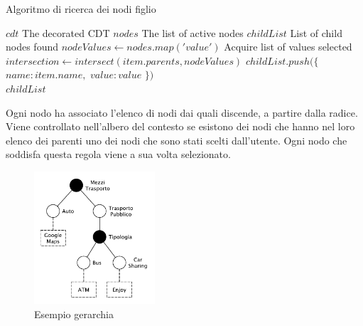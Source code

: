 \begin{algorithm}
	\caption{Algoritmo di ricerca dei nodi figlio}
	\label{alg:algoritmo-ricerca-nodi-figlio}
	\begin{algorithmic}
		\Require
			\Statex $cdt$ \Comment The decorated CDT
			\Statex $nodes$ \Comment The list of active nodes
		\Ensure
			\Statex $childList$ \Comment List of child nodes found
			\Statex
		\State $nodeValues \gets nodes.map('value')$ \Comment Acquire list of values selected
			\State $ intersection \gets intersect(item.parents, nodeValues) $
					\State $ childList.push(\{ $
					\State\hspace{\algorithmicindent} $ name: item.name, $
					\State\hspace{\algorithmicindent} $ value: value $
					\State $ \}) $
				\EndFor
			\EndIf
		\EndFor\\
		\Return $ childList $
	\end{algorithmic}
\end{algorithm}

Ogni nodo ha associato l'elenco di nodi dai quali discende, a partire dalla radice. Viene controllato nell'albero del contesto se esistono dei nodi che hanno nel loro elenco dei parenti uno dei nodi che sono stati scelti dall'utente. Ogni nodo che soddisfa questa regola viene a sua volta selezionato.

\begin{figure}[ht]
	\centering
	\includegraphics[width=0.4\textwidth]{4-metodologia/Immagini/esempio-gerarchia.pdf}
	\caption{Esempio gerarchia}\label{fig:esempio-gerarchia}
\end{figure}

